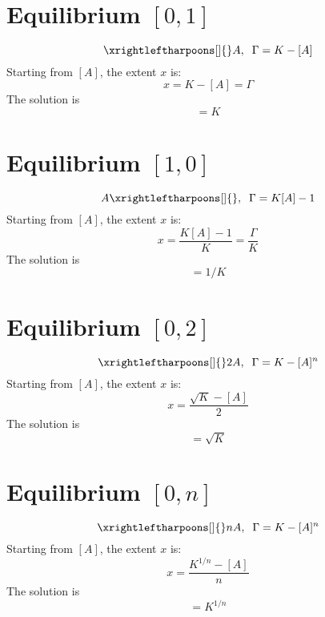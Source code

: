 \documentclass[aps,12pt]{revtex4}
\begin{document}
\section{Equilibrium $[0,1]$}
\begin{equation}
	\xrightleftharpoons[]{} A, \;\; \Gamma = K - [A]
\end{equation}
Starting from $[A]$, the extent $x$ is:
\begin{equation}
	x = K-[A] = \Gamma
\end{equation}
The solution is
\begin{equation}
	[A] = K
\end{equation}

\section{Equilibrium $[1,0]$}
\begin{equation}
	A \xrightleftharpoons[]{} , \;\; \Gamma = K[A]-1
\end{equation}
Starting from $[A]$, the extent $x$ is:
\begin{equation}
	x = \dfrac{K[A]-1}{K} = \dfrac{\Gamma}{K}
\end{equation}
The solution is
\begin{equation}
	[A] = 1/K
\end{equation}


\section{Equilibrium $[0,2]$}
\begin{equation}
	\xrightleftharpoons[]{} 2A, \;\; \Gamma = K - [A]^n
\end{equation}
Starting from $[A]$, the extent $x$ is:
\begin{equation}
	x = \dfrac{\sqrt{K}-[A]}{2}
\end{equation}
The solution is
\begin{equation}
	[A] = \sqrt{K}
\end{equation}

\section{Equilibrium $[0,n]$}
\begin{equation}
	\xrightleftharpoons[]{} nA, \;\; \Gamma = K - [A]^n
\end{equation}
Starting from $[A]$, the extent $x$ is:
\begin{equation}
	x = \dfrac{ K^{1/n}-[A]}{n}
\end{equation}
The solution is
\begin{equation}
	[A] = K^{1/n}
\end{equation}
\end{document}
